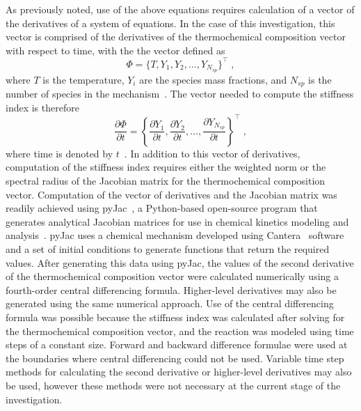 \documentclass[12pt]{ussci}
\begin{document}
As previously noted, use of the above equations requires calculation of a vector of the derivatives of a system of equations.  In the case of this investigation, this vector is comprised of the derivatives of the thermochemical composition vector with respect to time, with the the vector defined as
\begin{equation}
    \Phi = \{T, Y_1, Y_2, \dots, Y_{N_{sp}} \}^\intercal \;,
\end{equation}
where $T$ is the temperature, $Y_i$ are the species mass fractions, and $N_{sp}$ is the number of species in the mechanism~\cite{Niemeyer:2017}. The vector needed to compute the stiffness index is therefore
\begin{equation}
    \frac{\partial \Phi}{\partial t} = \left\{\frac{\partial Y_1}{\partial t}, \frac{\partial Y_2}{\partial t}, \dots, \frac{\partial Y_{N_{sp}}}{\partial t} \right\}^\intercal \;,
\end{equation}
where time is denoted by $t$~\cite{Niemeyer:2017}. In addition to this vector of derivatives, computation of the stiffness index requires either the weighted norm or the spectral radius of the Jacobian matrix for the thermochemical composition vector. Computation of the vector of derivatives and the Jacobian matrix was readily achieved using pyJac~\cite{pyJac:1.0.2}, a Python-based open-source program that generates analytical Jacobian matrices for use in chemical kinetics modeling and analysis~\cite{Niemeyer:2017}. pyJac uses a chemical mechanism developed using Cantera~\cite{Goodwin:2015aa} software and a set of initial conditions to generate functions that return the required values. After generating this data using pyJac, the values of the second derivative of the thermochemical composition vector were calculated numerically using a fourth-order central differencing formula. Higher-level derivatives may also be generated using the same numerical approach. Use of the central differencing formula was possible because the stiffness index was calculated after solving for the thermochemical composition vector, and the reaction was modeled using time steps of a constant size. Forward and backward difference formulae were used at the boundaries where central differencing could not be used. Variable time step methods for calculating the second derivative or higher-level derivatives may also be used, however these methods were not necessary at the current stage of the investigation.
\end{document}
